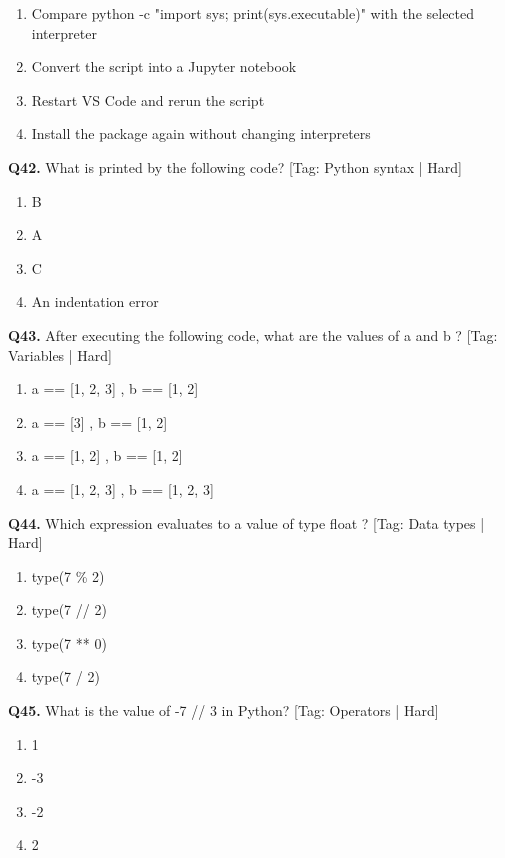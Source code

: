\begin{enumerate}[label=(\alph*),topsep=2pt,itemsep=1pt,partopsep=0pt,parsep=0pt]
    \item {Compare python -c "import sys; print(sys.executable)" with the selected interpreter}
    \item {Convert the script into a Jupyter notebook}
    \item {Restart VS Code and rerun the script}
    \item {Install the package again without changing interpreters}
\end{enumerate}
\vspace{2mm}
\noindent\textbf{Q42.} What is printed by the following code? \hfill [Tag: Python syntax | Hard]
\begin{enumerate}[label=(\alph*),topsep=2pt,itemsep=1pt,partopsep=0pt,parsep=0pt]
    \item {B}
    \item {A}
    \item {C}
    \item {An indentation error}
\end{enumerate}
\vspace{2mm}
\noindent\textbf{Q43.} After executing the following code, what are the values of a and b ? \hfill [Tag: Variables | Hard]
\begin{enumerate}[label=(\alph*),topsep=2pt,itemsep=1pt,partopsep=0pt,parsep=0pt]
    \item {a == [1, 2, 3] , b == [1, 2]}
    \item {a == [3] , b == [1, 2]}
    \item {a == [1, 2] , b == [1, 2]}
    \item {a == [1, 2, 3] , b == [1, 2, 3]}
\end{enumerate}
\vspace{2mm}
\noindent\textbf{Q44.} Which expression evaluates to a value of type float ? \hfill [Tag: Data types | Hard]
\begin{enumerate}[label=(\alph*),topsep=2pt,itemsep=1pt,partopsep=0pt,parsep=0pt]
    \item {type(7 \% 2)}
    \item {type(7 // 2)}
    \item {type(7 ** 0)}
    \item {type(7 / 2)}
\end{enumerate}
\vspace{2mm}
\noindent\textbf{Q45.} What is the value of -7 // 3 in Python? \hfill [Tag: Operators | Hard]
\begin{enumerate}[label=(\alph*),topsep=2pt,itemsep=1pt,partopsep=0pt,parsep=0pt]
    \item {1}
    \item {-3}
    \item {-2}
    \item {2}
\end{enumerate}
